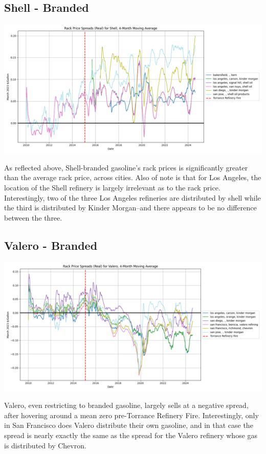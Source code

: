 \documentclass{article}
\begin{document}
\subsection{Shell - Branded} 
\centering \includegraphics[width=5.5in]{shell_spread.png} \\
\raggedright As reflected above, Shell-branded gasoline's rack prices is significantly greater than the average rack price, across cities. Also of note is that for Los Angeles, the location of the Shell refinery is largely irrelevant as to the rack price. Interestingly, two of the three Los Angeles refineries are distributed by shell while the third is distributed by Kinder Morgan--and there appears to be no difference between the three. 

\subsection{Valero - Branded} 
\centering \includegraphics[width=5.5in]{valero_spread.png} \\
\raggedright Valero, even restricting to branded gasoline, largely sells at a negative spread, after hovering around a mean zero pre-Torrance Refinery Fire. Interestingly, only in San Francisco does Valero distribute their own gasoline, and in that case the spread is nearly exactly the same as the spread for the Valero refinery whose gas is distributed by Chevron. 
\end{document}
